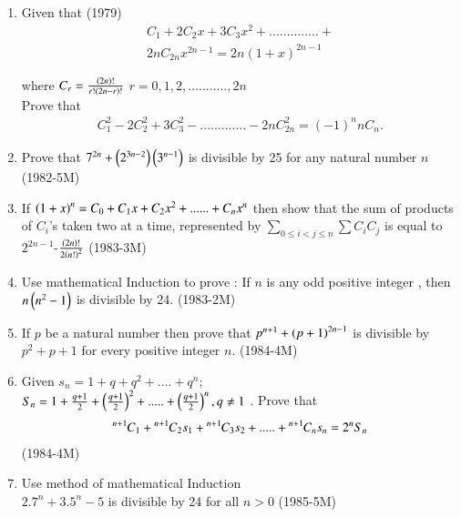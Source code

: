 \documentclass[journal,12pt,twocolumn]{IEEEtran}
\theoremstyle{remark}
\begin{document}
    
     \begin{enumerate}
		
          \item Given that  \hfill{(1979)} 
			  \begin{multline*}
C_1 + 2C_2x + 3C_3x^2 + .............. +\\ 2nC_{2n}x^{2n-1}   =    2n(1+x)^{2n-1} 
			  \end{multline*}
		
		where $C_r =\frac{\left(2n\right)!}{r!\left(2n-r\right)!}$ $r=0,1,2,...........,2n$\\
		          Prove that  \begin{align*} 
		     C^2_1-2C_2^2+3C_3^2-.............-2nC_{2n}^2  = (-1)^nnC_n. 
		     \end{align*}  

	   \item Prove that $ 7^{2n} + \left(2^{3n-2}\right)  \left(3^{n-1}\right) $ is divisible by 25 for any natural number $ n$ \hfill{(1982-5M)}  


           \item If $ \left(1+x\right)^n= C_0 + C_1x +C_2x^2+......+C_nx^n $ then show that the sum of products of $ C_i $'s taken
		   two at a time, represented by $ \displaystyle\sum_{0 \leq i<j \leq n} \displaystyle\sum C_i C_j $ is equal to $ 2^{2n-1}$-$\frac{\left(2n\right)!} {2\left(n!\right)^2} $ \hfill{(1983-3M)}

	   \item Use mathematical Induction to prove : If $n$ is any odd positive integer , then  $ n\left(n^2-1\right) $ is divisible by 24.
		   \hfill{(1983-2M)}


	   \item If $ p $ be a natural number then prove that $ p^{n+1}+\left(p+1\right)^{2n-1} $ is divisible by $ p^2+p+1 $ for every positive integer $n$. \hfill{(1984-4M)} 

            \item Given  $ s_n = 1 + q + q^2 +....+q^n;$\\
		    $ S_n = 1 + \frac{q+1}{2}+\left(\frac{q+1}{2}\right)^2+.....+\left(\frac{q+1}{2}\right)^n,q\neq1 $ . Prove that	\begin{align*} 
			    {{}^{n+1}\mkern-1muC_{1}}+{{}^{n+1}\mkern-1muC_{2}}s_1+{{}^{n+1}\mkern-1muC_{3}}s_2+.....+{{}^{n+1}\mkern-1muC_{n}}s_n=2^nS_n
		    \end{align*}    \hfill{(1984-4M)}


	    \item Use method of mathematical Induction \\ $ 2.7^n +3.5^n-5 $ is divisible by 24 for all $ n>0 $ \hfill{(1985-5M)}



\end{enumerate}
\end{document}
